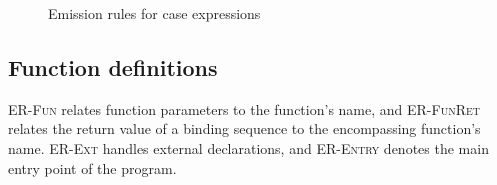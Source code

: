 \documentclass[main.tex]{subfiles}
\begin{document}
  \begin{figure}[h]
  \caption{Emission rules for case expressions}
  \label{fig:er-case}
  \end{figure}

	\subsection{Function definitions}
	
	\textsc{ER-Fun} relates function parameters to the function's name, and \textsc{ER-FunRet} relates the return value of a binding sequence to the encompassing function's name. \textsc{ER-Ext} handles external declarations, and \textsc{ER-Entry} denotes the main entry point of the program.
\end{document}
